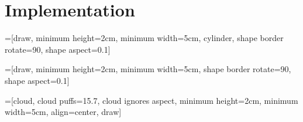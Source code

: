 \chapter{Implementation}

=[draw, 
  minimum height=2cm, 
  minimum width=5cm, 
  cylinder, 
  shape border rotate=90, 
  shape aspect=0.1]

=[draw, 
  minimum height=2cm, 
  minimum width=5cm, 
  shape border rotate=90, 
  shape aspect=0.1]

=[cloud, 
    cloud puffs=15.7, 
    cloud ignores aspect, 
    minimum height=2cm, 
    minimum width=5cm, 
    align=center, 
    draw]


\begin{figure}[H]
  \centering
\end{figure}

\section{}
